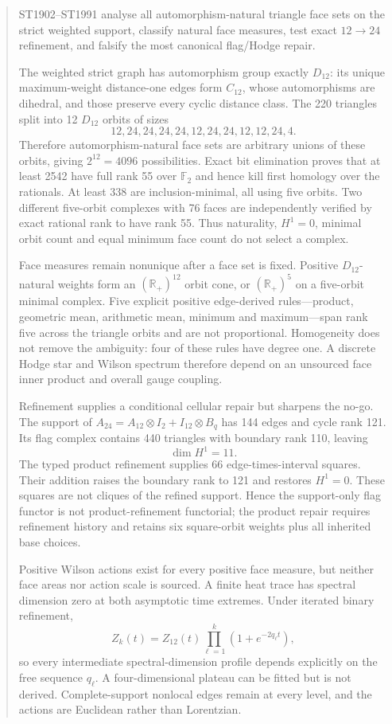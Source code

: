 \documentclass[11pt,a4paper]{article}
\begin{document}
\begin{abstract}
ST1902--ST1991 analyse all automorphism-natural triangle face sets on the strict
weighted support, classify natural face measures, test exact $12\to24$
refinement, and falsify the most canonical flag/Hodge repair.

The weighted strict graph has automorphism group exactly $D_{12}$: its unique
maximum-weight distance-one edges form $C_{12}$, whose automorphisms are
dihedral, and those preserve every cyclic distance class.  The 220 triangles
split into 12 $D_{12}$ orbits of sizes
\[
12,24,24,24,24,12,24,24,12,12,24,4.
\]
Therefore automorphism-natural face sets are arbitrary unions of these orbits,
giving $2^{12}=4096$ possibilities.  Exact bit elimination proves that at
least 2542 have full rank 55 over $\mathbb F_2$ and hence kill first homology
over the rationals.  At least 338 are inclusion-minimal, all using five orbits.
Two different five-orbit complexes with 76 faces are independently verified by
exact rational rank to have rank 55.  Thus naturality, $H^1=0$, minimal orbit
count and equal minimum face count do not select a complex.

Face measures remain nonunique after a face set is fixed.  Positive
$D_{12}$-natural weights form an $(\mathbb R_+)^{12}$ orbit cone, or
$(\mathbb R_+)^5$ on a five-orbit minimal complex.  Five explicit positive
edge-derived rules---product, geometric mean, arithmetic mean, minimum and
maximum---span rank five across the triangle orbits and are not proportional.
Homogeneity does not remove the ambiguity: four of these rules have degree
one.  A discrete Hodge star and Wilson spectrum therefore depend on an
unsourced face inner product and overall gauge coupling.

Refinement supplies a conditional cellular repair but sharpens the no-go.  The
support of $A_{24}=A_{12}\otimes I_2+I_{12}\otimes B_q$ has 144 edges and
cycle rank 121.  Its flag complex contains 440 triangles with boundary rank
110, leaving
\[
\dim H^1=11.
\]
The typed product refinement supplies 66 edge-times-interval squares.  Their
addition raises the boundary rank to 121 and restores $H^1=0$.  These squares
are not cliques of the refined support.  Hence the support-only flag functor is
not product-refinement functorial; the product repair requires refinement
history and retains six square-orbit weights plus all inherited base choices.

Positive Wilson actions exist for every positive face measure, but neither
face areas nor action scale is sourced.  A finite heat trace has spectral
dimension zero at both asymptotic time extremes.  Under iterated binary
refinement,
\[
Z_k(t)=Z_{12}(t)\prod_{\ell=1}^k(1+e^{-2q_\ell t}),
\]
so every intermediate spectral-dimension profile depends explicitly on the
free sequence $q_\ell$.  A four-dimensional plateau can be fitted but is not
derived.  Complete-support nonlocal edges remain at every level, and the
actions are Euclidean rather than Lorentzian.


\end{abstract}
\end{document}
